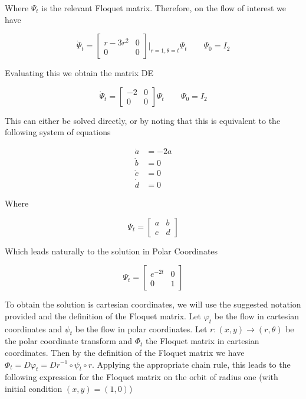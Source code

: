 \documentclass{article}
\begin{document}
Where $\Psi_t$ is the relevant Floquet matrix. Therefore, on the flow of interest we have 

\begin{equation*}
	\dot \Psi_t = 
	\begin{bmatrix}
		r - 3r^2 & 0 \\ 0 & 0
	\end{bmatrix}
	\biggr\rvert_{r = 1, \theta = t} \Psi_t \qquad \Psi_0 = I_2
\end{equation*}

Evaluating this we obtain the matrix DE

\begin{equation*}
	\dot \Psi_t = 
	\begin{bmatrix}
		-2 & 0 \\ 0 & 0
	\end{bmatrix} \Psi_t \qquad \Psi_0 = I_2
\end{equation*}

This can either be solved directly, or by noting that this is equivalent to the following system 
of equations 

\begin{align*}
	\dot a &= -2a \\ 
	\dot b &= 0 \\
	\dot c & = 0 \\
	\dot d &= 0 
\end{align*}

Where 

\begin{equation*}
	\Psi_t = 
	\begin{bmatrix}
		a & b \\ c & d
	\end{bmatrix}
\end{equation*}

Which leads naturally to the solution in Polar Coordinates 

\begin{equation*}
	\Psi_t = 
	\begin{bmatrix}
		e^{-2t} & 0 \\ 0 & 1
	\end{bmatrix}
\end{equation*}

To obtain the solution is cartesian coordinates, we will use the suggested notation provided 
and the definition of the Floquet matrix. Let $\varphi_t$ be the flow in cartesian coordinates 
and $\psi_t$ be the flow in polar coordinates. Let $r:(x,y) \rightarrow (r,\theta)$ be the 
polar coordinate transform and $\Phi_t$ the Floquet matrix in cartesian coordinates. Then by the definition of 
the Floquet matrix we have $\Phi_t = D\varphi_t = Dr^{-1}\circ \psi_t \circ r$. Applying the appropriate 
chain rule, this leads to the following expression for the Floquet matrix on the orbit of radius 
one (with initial condition $(x,y) = (1,0)$)
\end{document}

